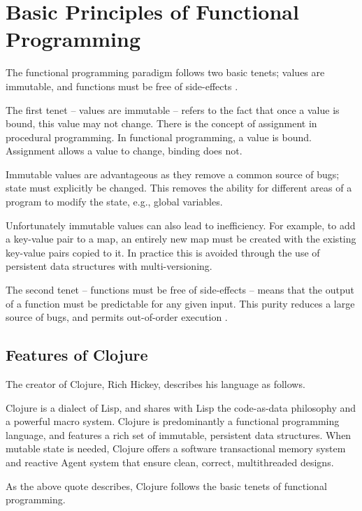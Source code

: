 \section{Basic Principles of Functional Programming}
\label{sec:basic-principles-fp}
	The functional programming paradigm follows two basic tenets; values are immutable, and functions must be free of side-effects \cite{fp-89}.
	
	The first tenet -- values are immutable -- refers to the fact that once a value is bound, this value may not change.  There is the concept of assignment in procedural programming.  In functional programming, a value is bound.  Assignment allows a value to change, binding does not.
	
	Immutable values are advantageous as they remove a common source of bugs; state must explicitly be changed.  This removes the ability for different areas of a program to modify the state, e.g., global variables.
	
	Unfortunately immutable values can also lead to inefficiency.  For example, to add a key-value pair to a map, an entirely new map must be created with the existing key-value pairs copied to it.  In practice this is avoided through the use of persistent data structures with multi-versioning.
	
	The second tenet -- functions must be free of side-effects -- means that the output of a function must be predictable for any given input.  This purity reduces a large source of bugs, and permits out-of-order execution \cite{fp-89}.

	\subsection{Features of Clojure}
	\label{sec:features-of-clojure}
		The creator of Clojure, Rich Hickey, describes his language as follows.
		
		\begin{displayquote}
			Clojure is a dialect of Lisp, and shares with Lisp the code-as-data philosophy and a powerful macro system.  Clojure is predominantly a functional programming language, and features a rich set of immutable, persistent data structures.  When mutable state is needed, Clojure offers a software transactional memory system and reactive Agent system that ensure clean, correct, multithreaded designs.
		\end{displayquote}
		
		As the above quote describes, Clojure follows the basic tenets of functional programming.
		
